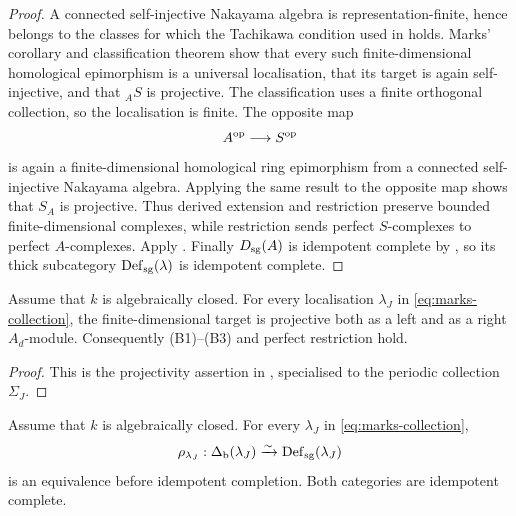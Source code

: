 \begin{proof}
A connected self-injective Nakayama algebra is representation-finite, hence belongs to the classes for which the Tachikawa condition used in \cite[Corollary~3.7]{Marks15} holds.  Marks' corollary and classification theorem \cite[Theorem~5.14]{Marks15} show that every such finite-dimensional homological epimorphism is a universal localisation, that its target is again self-injective, and that \({}_AS\) is projective.  The classification uses a finite orthogonal collection, so the localisation is finite.  The opposite map
\[
 A^{\mathrm{op}}\longrightarrow S^{\mathrm{op}}
\]
is again a finite-dimensional homological ring epimorphism from a connected self-injective Nakayama algebra.  Applying the same result to the opposite map shows that \(S_A\) is projective.  Thus derived extension and restriction preserve bounded finite-dimensional complexes, while restriction sends perfect \(S\)-complexes to perfect \(A\)-complexes.  Apply .  Finally \(D_{\mathrm{sg}}(A)\) is idempotent complete by \cite[Corollary~2.4]{ChenRadicalSquareZero}, so its thick subcategory \(\operatorname{Def}_{\mathrm{sg}}(\lambda)\) is idempotent complete.
\end{proof}

\begin{proposition}\label{prop:marks-projectivity}
Assume that \(k\) is algebraically closed.  For every localisation \(\lambda_J\) in \eqref{eq:marks-collection}, the finite-dimensional target is projective both as a left and as a right \(A_d\)-module.  Consequently (B1)--(B3) and perfect restriction hold.
\end{proposition}

\begin{proof}
This is the projectivity assertion in , specialised to the periodic collection \(\Sigma_J\).
\end{proof}

\begin{corollary}\label{cor:marks-comparison}
Assume that \(k\) is algebraically closed.  For every \(\lambda_J\) in \eqref{eq:marks-collection},
\[
 \rho_{\lambda_J}:\Delta_{\mathrm b}(\lambda_J)
 \xrightarrow{\sim}
 \operatorname{Def}_{\mathrm{sg}}(\lambda_J)
\]
is an equivalence before idempotent completion.  Both categories are idempotent complete.
\end{corollary}

